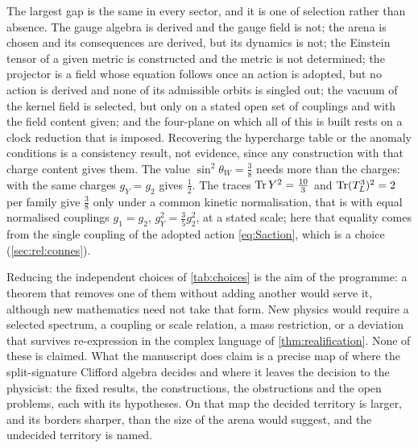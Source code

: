 The largest gap is the same in every sector, and it is one of selection rather than absence. The gauge algebra is derived and the gauge
field is not; the arena is chosen and its consequences are derived, but its dynamics is not; the Einstein tensor of a given metric is constructed and the metric is not
determined; the projector is a field whose equation follows once an action is adopted, but no action is derived and none of its admissible
orbits is singled out; the vacuum of the kernel field is selected, but only on a stated open set of couplings and with the field content
given; and the four-plane on which all of this is built rests on a clock reduction that is imposed. Recovering the hypercharge table or the
anomaly conditions is a consistency result, not evidence, since any construction with that charge content gives them. The value
$\sin^2\theta_W=\tfrac38$ needs more than the charges: with the same charges $g_Y=g_2$ gives $\tfrac12$. The traces $\operatorname{Tr} Y^2=\tfrac{10}3$ and
$\operatorname{Tr}(T^3_L)^2=2$ per family give $\tfrac38$ only under a common kinetic normalisation, that is with equal normalised couplings $g_1=g_2$,
$g_Y^2=\tfrac35g_2^2$, at a stated scale; here that equality comes from the single coupling of the adopted action \eqref{eq:Saction}, which is a
choice (\cref{sec:rel:connes}).

Reducing the independent choices of \cref{tab:choices} is the aim of the programme: a theorem that removes one of them without adding another
would serve it, although new mathematics need not take that form. New physics would require a
selected spectrum, a coupling or scale relation, a mass restriction, or a deviation that survives re-expression in the complex language of
\cref{thm:realification}. None of these is claimed. What the manuscript does claim is a precise map of where the split-signature Clifford
algebra decides and where it leaves the decision to the physicist: the fixed results, the constructions, the obstructions and the open
problems, each with its hypotheses. On that map the decided territory is larger, and its borders sharper, than the size of the arena would
suggest, and the undecided territory is named.
